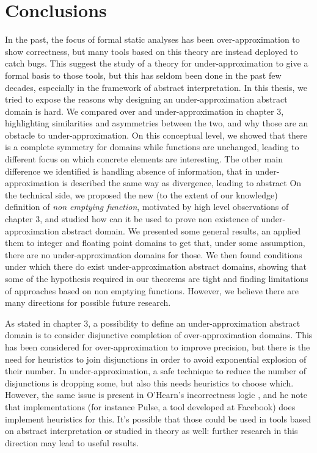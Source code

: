 \chapter{Conclusions}
In the past, the focus of formal static analyses has been over-approximation to show correctness, but many tools based on this theory are instead deployed to catch bugs. This suggest the study of a theory for under-approximation to give a formal basis to those tools, but this has seldom been done in the past few decades, especially in the framework of abstract interpretation.
In this thesis, we tried to expose the reasons why designing an under-approximation abstract domain is hard. We compared over and under-approximation in chapter 3, highlighting similarities and asymmetries between the two, and why those are an obstacle to under-approximation. On this conceptual level, we showed that there is a complete symmetry for domains while functions are unchanged, leading to different focus on which concrete elements are interesting. The other main difference we identified is handling absence of information, that in under-approximation is described the same way as divergence, leading to abstract
On the technical side, we proposed the new (to the extent of our knowledge) definition of \textit{non emptying function}, motivated by high level observations of chapter 3, and studied how can it be used to prove non existence of under-approximation abstract domain. We presented some general results, an applied them to integer and floating point domains to get that, under some assumption, there are no under-approximation domains for those. We then found conditions under which there do exist under-approximation abstract domains, showing that some of the hypothesis required in our theorems are tight and finding limitations of approaches based on non emptying functions.
However, we believe there are many directions for possible future research.

As stated in chapter 3, a possibility to define an under-approximation abstract domain is to consider disjunctive completion of over-approximation domains. This has been considered for over-approximation\cite{file-disjunctive-completion} to improve precision, but there is the need for heuristics to join disjunctions in order to avoid exponential explosion of their number.
In under-approximation, a safe technique to reduce the number of disjunctions is dropping some, but also this needs heuristics to choose which. However, the same issue is present in O'Hearn's incorrectness logic \cite{ohearn-incorrectness-logic}, and he note that implementations (for instance Pulse, a tool developed at Facebook) does implement heuristics for this. It's possible that those could be used in tools based on abstract interpretation or studied in theory as well: further research in this direction may lead to useful results.


